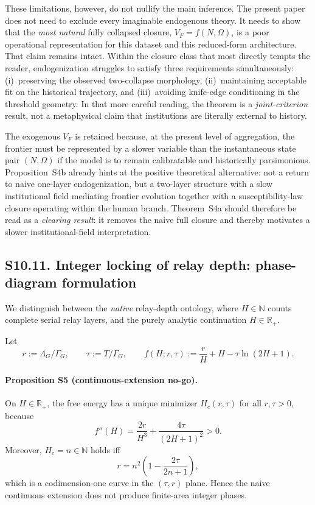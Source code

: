 \documentclass[11pt]{article}
\begin{document}
These limitations, however, do not nullify the main inference.
The present paper does not need to exclude every imaginable endogenous theory.
It needs to show that the \emph{most natural} fully collapsed closure,
$V_F=f(N,\Omega)$, is a poor operational representation for this dataset and
this reduced-form architecture.
That claim remains intact.
Within the closure class that most directly tempts the reader, endogenization
struggles to satisfy three requirements simultaneously:
(i)~preserving the observed two-collapse morphology,
(ii)~maintaining acceptable fit on the historical trajectory, and
(iii)~avoiding knife-edge conditioning in the threshold geometry.
In that more careful reading, the theorem is a \emph{joint-criterion} result,
not a metaphysical claim that institutions are literally external to history.

The exogenous $V_F$ is retained because, at the present level of aggregation,
the frontier must be represented by a slower variable than the instantaneous
state pair $(N,\Omega)$ if the model is to remain calibratable and historically
parsimonious.
Proposition~S4b already hints at the positive theoretical alternative:
not a return to naive one-layer endogenization, but a two-layer structure
with a slow institutional field mediating frontier evolution together with a
susceptibility-law closure operating within the human branch.
Theorem~S4a should therefore be read as a \emph{clearing result}:
it removes the naive full closure and thereby motivates a slower
institutional-field interpretation.


\subsection*{S10.11. Integer locking of relay depth: phase-diagram formulation}
\label{sec:S10_11_integer_locking}

We distinguish between the \emph{native} relay-depth ontology, where
$H\in\mathbb{N}$ counts complete serial relay layers, and the purely analytic
continuation $H\in\mathbb{R}_{+}$.

Let
\[
r:=\Lambda_G/\Gamma_G,\qquad
\tau:=T/\Gamma_G,\qquad
f(H;r,\tau):=\frac{r}{H}+H-\tau\ln(2H+1).
\]

\paragraph{Proposition S5 (continuous-extension no-go).}
On $H\in\mathbb{R}_{+}$, the free energy has a unique minimizer
$H_c(r,\tau)$ for all $r,\tau>0$, because
\[
f''(H)=\frac{2r}{H^3}+\frac{4\tau}{(2H+1)^2}>0.
\]
Moreover, $H_c=n\in\mathbb{N}$ holds iff
\[
r=n^2\!\left(1-\frac{2\tau}{2n+1}\right),
\]
which is a codimension-one curve in the $(\tau,r)$ plane.  Hence the naive
continuous extension does not produce finite-area integer phases.
\end{document}
